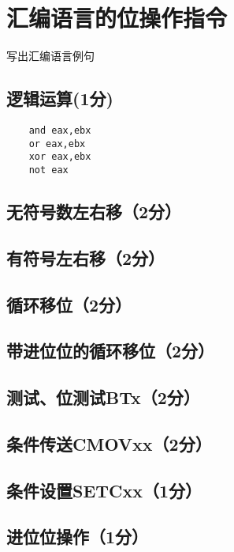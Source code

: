 \section{汇编语言的位操作指令}
\begin{center}
    写出汇编语言例句
\end{center}

\subsection{逻辑运算(1分)}

\begin{lstlisting}
    and eax,ebx
    or eax,ebx
    xor eax,ebx
    not eax
\end{lstlisting}

\subsection{无符号数左右移（2分）}

\subsection{有符号左右移（2分）}

\subsection{循环移位（2分）}

\subsection{带进位位的循环移位（2分）}

\subsection{测试、位测试BTx（2分）}

\subsection{条件传送CMOVxx（2分）}

\subsection{条件设置SETCxx（1分）}

\subsection{进位位操作（1分）}